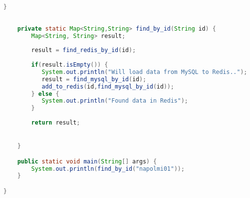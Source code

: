 \documentclass[11pt, oneside]{article}   	%
\begin{document}
\begin{lstlisting}[language=java]
    }
    
    
    private static Map<String,String> find_by_id(String id) {
        Map<String, String> result;
        
        result = find_redis_by_id(id);
        
        if(result.isEmpty()) {
           System.out.println("Will load data from MySQL to Redis..");
           result = find_mysql_by_id(id);
           add_to_redis(id,find_mysql_by_id(id));
        } else {
           System.out.println("Found data in Redis");
        }
           
        return result;


    }

    public static void main(String[] args) {
        System.out.println(find_by_id("napolmi01"));
    }

}

\end{lstlisting}
\end{document}
